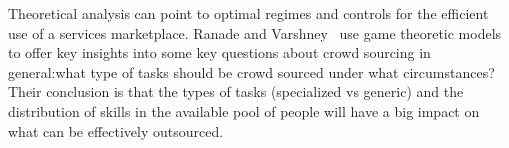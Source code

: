  Theoretical analysis can point to optimal regimes and controls for the efficient use of a services marketplace. Ranade and Varshney~\cite{glo-ranade} use game theoretic models to offer key insights into some key questions about crowd sourcing in general:what type of tasks should be crowd sourced under what circumstances? Their conclusion is that  the types of tasks (specialized vs generic) and the distribution of skills in the available pool of people will have a big impact on what can be effectively outsourced. 

\label{sec:global}



